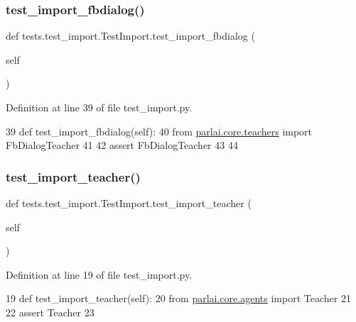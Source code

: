 \subsubsection{\texorpdfstring{test\+\_\+import\+\_\+fbdialog()}{test\_import\_fbdialog()}}
{\footnotesize\ttfamily def tests.\+test\+\_\+import.\+Test\+Import.\+test\+\_\+import\+\_\+fbdialog (\begin{DoxyParamCaption}\item[{}]{self }\end{DoxyParamCaption})}



Definition at line 39 of file test\+\_\+import.\+py.


\begin{DoxyCode}
39     \textcolor{keyword}{def }test\_import\_fbdialog(self):
40         \textcolor{keyword}{from} \hyperlink{namespaceparlai_1_1core_1_1teachers}{parlai.core.teachers} \textcolor{keyword}{import} FbDialogTeacher
41 
42         \textcolor{keyword}{assert} FbDialogTeacher
43 
44 
\end{DoxyCode}
\mbox{\label{classtests_1_1test__import_1_1TestImport_af48db1b740c81424df27e10c66481770}} 
\subsubsection{\texorpdfstring{test\+\_\+import\+\_\+teacher()}{test\_import\_teacher()}}
{\footnotesize\ttfamily def tests.\+test\+\_\+import.\+Test\+Import.\+test\+\_\+import\+\_\+teacher (\begin{DoxyParamCaption}\item[{}]{self }\end{DoxyParamCaption})}



Definition at line 19 of file test\+\_\+import.\+py.


\begin{DoxyCode}
19     \textcolor{keyword}{def }test\_import\_teacher(self):
20         \textcolor{keyword}{from} \hyperlink{namespaceparlai_1_1core_1_1agents}{parlai.core.agents} \textcolor{keyword}{import} Teacher
21 
22         \textcolor{keyword}{assert} Teacher
23 
\end{DoxyCode}
\mbox{\label{classtests_1_1test__import_1_1TestImport_a3a90634703bb67d0bb0b3ac5352657ad}} 
